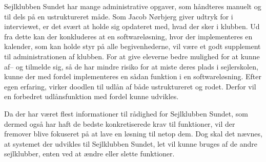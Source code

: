 Sejlklubben Sundet har mange administrative opgaver, som håndteres manuelt og til dels på en ustruktureret måde. 
Som Jacob Nørbjerg giver udtryk for i interviewet, er det svært at holde sig opdateret med, hvad der sker i klubben.
Ud fra dette kan der konkluderes at en softwareløsning, hvor der implementeres en kalender, som kan holde styr på alle begivenhederne, vil være et godt supplement til administrationen af klubben. 
For at give eleverne bedre mulighed for at kunne af-- og tilmelde sig, så de har mindre risiko for at miste deres plads i sejlerskolen, kunne der med fordel implementeres en sådan funktion i en softwareløsning. 
Efter egen erfaring, virker doodlen til udlån af både ustruktureret og rodet. 
Derfor vil en forbedret udlånsfunktion med fordel kunne udvikles.

Da der har været flest informationer til rådighed for Sejlklubben Sundet, som dermed også har haft de bedste konkretiserede krav til funktioner, vil der fremover blive fokuseret på at lave en løsning til netop dem. 
Dog skal det nævnes, at systemet der udvikles til Sejlklubben Sundet, let vil kunne bruges af de andre sejlklubber, enten ved at ændre eller slette funktioner. 

